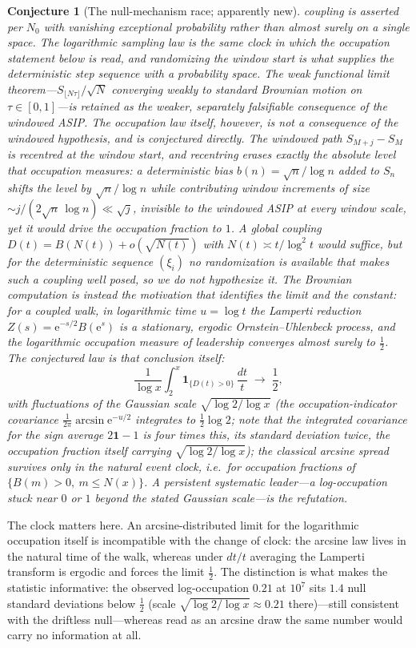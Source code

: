 \documentclass[11pt]{article}
\newtheorem{conjecture}{Conjecture}
\theoremstyle{definition}
\newcommand{\e}{\mathrm{e}}
\begin{document}
\begin{conjecture}[The null-mechanism race; apparently new]
coupling is asserted per $N_0$ with vanishing exceptional
probability rather than almost surely on a single space.  The
logarithmic sampling law is the same clock in which the occupation
statement below is read, and randomizing the window start is what
supplies the deterministic step sequence with a probability space.
The weak
functional limit theorem---$S_{\lfloor N\tau\rfloor}/\sqrt N$
converging weakly to standard Brownian motion on
$\tau\in[0,1]$---is retained as the weaker, separately
falsifiable consequence of the windowed ASIP.  The occupation law
itself, however, is \emph{not} a consequence of the windowed
hypothesis, and is conjectured directly.  The windowed path
$S_{M+j}-S_M$ is recentred at the window start, and recentring
erases exactly the absolute level that occupation measures: a
deterministic bias $b(n)=\sqrt n/\log n$ added to $S_n$ shifts the
level by $\sqrt n/\log n$ while contributing window increments of
size ${\sim}j/(2\sqrt n\,\log n)\ll\sqrt j$, invisible to the
windowed ASIP at every window scale, yet it would drive the
occupation fraction to $1$.  A global coupling
$D(t)=B(N(t))+o(\sqrt{N(t)})$
with $N(t)\asymp t/\log^2t$ would suffice, but for the
deterministic sequence $(\xi_i)$ no randomization is available that
makes such a coupling well posed, so we do not hypothesize it.  The
Brownian computation is instead the motivation that identifies the
limit and the constant: for a coupled walk, in \emph{logarithmic}
time
$u=\log t$ the
Lamperti reduction $Z(s)=\e^{-s/2}B(\e^s)$ is a stationary, ergodic
Ornstein--Uhlenbeck process, and the logarithmic occupation measure
of leadership converges almost surely to $\tfrac12$.  The
conjectured law is that conclusion itself:
\[
\frac1{\log x}\int_2^x\mathbf 1_{\{D(t)>0\}}\,\frac{dt}t
\;\longrightarrow\;\frac12,
\]
with fluctuations of the Gaussian scale
$\sqrt{\log2/\log x}$ (the occupation-indicator covariance
$\frac1{2\pi}\arcsin\e^{-u/2}$ integrates to $\tfrac12\log2$; note that the integrated covariance for the \emph{sign} average $2\mathbf 1-1$ is four times this, its standard deviation twice, the occupation fraction itself carrying
$\sqrt{\log2/\log x}$); the classical
arcsine spread survives only in the \emph{natural} event clock,
i.e.\ for occupation fractions of $\{B(m)>0,\ m\le N(x)\}$.  A
persistent systematic leader---a log-occupation stuck near $0$ or
$1$ beyond the stated Gaussian scale---is the refutation.
\end{conjecture}

The clock matters here.  An arcsine-distributed limit for the
logarithmic occupation itself is incompatible with the change of
clock: the arcsine law lives in the natural time of the walk, whereas
under $dt/t$ averaging the Lamperti transform is ergodic and forces
the limit $\tfrac12$.  The distinction is what makes the statistic
informative: the observed log-occupation $0.21$ at $10^7$ sits $1.4$
null standard deviations below $\tfrac12$ (scale
$\sqrt{\log2/\log x}\approx0.21$ there)---still consistent with the
driftless null---whereas read as an arcsine draw the same number would
carry no information at all.
\end{document}
